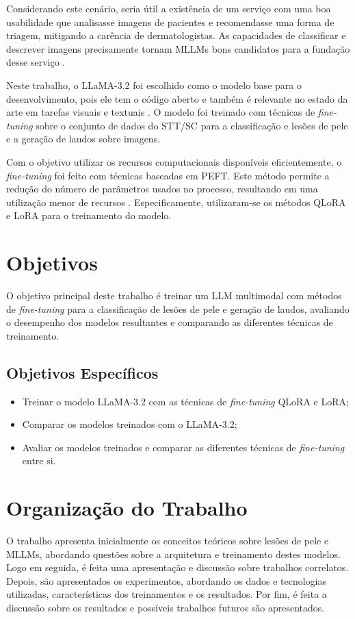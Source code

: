 Considerando este cenário, seria útil a existência de um serviço com uma boa usabilidade que analisasse imagens de
pacientes e recomendasse uma forma de triagem, mitigando a carência de dermatologistas. As capacidades de classificar e
descrever imagens precisamente tornam \acp{MLLM} bons candidatos para a fundação desse serviço
\cite{mllm_success_rate}.

Neste trabalho, o \ac{LLaMA}-3.2 foi escolhido como o modelo base para o desenvolvimento, pois ele tem o código aberto
e também é relevante no estado da arte em tarefas visuais e textuais \cite{dubey2024llama}. O modelo foi treinado com
técnicas de \textit{fine-tuning} sobre o conjunto de dados do \ac{STT/SC} para a classificação e lesões de pele e a
geração de laudos sobre imagens.

Com o objetivo utilizar os recursos computacionais disponíveis eficientemente, o \textit{fine-tuning} foi feito com
técnicas baseadas em \ac{PEFT}. Este método permite a redução do número de parâmetros usados no processo, resultando em
uma utilização menor de recursos \cite{peft}. Especificamente, utilizaram-se os métodos \ac{QLoRA} e \ac{LoRA} para o
treinamento do modelo.

\section{Objetivos}

O objetivo principal deste trabalho é treinar um \ac{LLM} multimodal com métodos de \textit{fine-tuning} para a
classificação de lesões de pele e geração de laudos, avaliando o desempenho dos modelos resultantes e comparando as
diferentes técnicas de treinamento.

\subsection*{Objetivos Específicos}

\begin{itemize}
    \item Treinar o modelo \ac{LLaMA}-3.2 com as técnicas de \textit{fine-tuning} \ac{QLoRA} e \ac{LoRA};
    \item Comparar os modelos treinados com o \ac{LLaMA}-3.2;
    \item Avaliar os modelos treinados e comparar as diferentes técnicas de \textit{fine-tuning} entre si.
\end{itemize}

\section{Organização do Trabalho}


O trabalho apresenta inicialmente os conceitos teóricos sobre lesões de pele e \acp{MLLM}, abordando questões sobre a
arquitetura e treinamento destes modelos. Logo em seguida, é feita uma apresentação e discussão sobre trabalhos
correlatos. Depois, são apresentados os experimentos, abordando os dados e tecnologias utilizadas, características dos
treinamentos e os resultados. Por fim, é feita a discussão sobre os resultados e possíveis trabalhos futuros são
apresentados.
